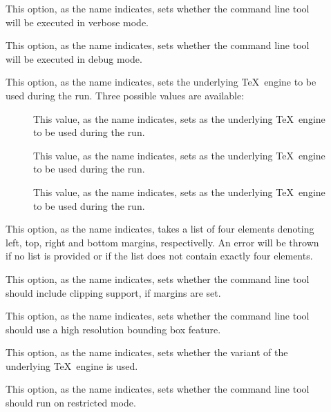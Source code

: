 \begin{description}
\begin{description}
\item[] This option, as the name indicates, sets whether the command line tool will be executed in verbose mode.

\item[] This option, as the name indicates, sets whether the command line tool will be executed in debug mode.

\item[] This option, as the name indicates, sets the underlying \TeX\ engine to be used during the run. Three possible values are available:

\begin{description}
\item[] This value, as the name indicates, sets  as the underlying \TeX\ engine to be used during the run.

\item[] This value, as the name indicates, sets  as the underlying \TeX\ engine to be used during the run.

\item[] This value, as the name indicates, sets  as the underlying \TeX\ engine to be used during the run.
\end{description}

\item[] This option, as the name indicates, takes a list of four elements denoting left, top, right and bottom margins, respectivelly. An error will be thrown if no list is provided or if the list does not contain exactly four elements.

\item[] This option, as the name indicates, sets whether the command line tool should include clipping support, if margins are set.

\item[] This option, as the name indicates, sets whether the command line tool should use a high resolution bounding box feature.

\item[] This option, as the name indicates, sets whether the  variant of the underlying \TeX\ engine is used.

\item[] This option, as the name indicates, sets whether the command line tool should run on restricted mode.


\end{description}
\end{description}
